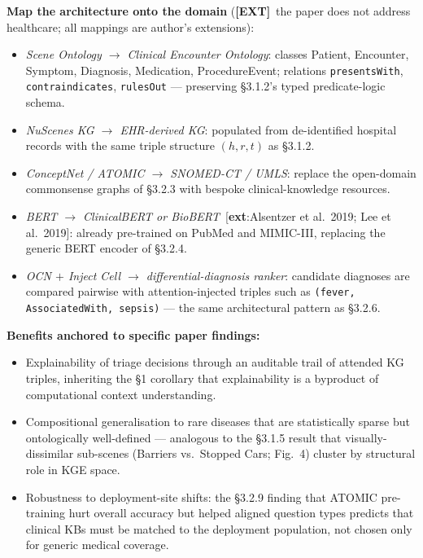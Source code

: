 \documentclass[11pt, a4paper]{article}
\newcommand{\extref}[1]{\textcolor{srcBd}{\small[\textbf{ext}:#1]}}
\newcommand{\extflag}{\textcolor{trapBd}{\textbf{[EXT]}}\,}
\begin{document}
\textbf{Map the architecture onto the domain} (\extflag{} the paper does not address healthcare; all mappings are author's extensions):
\begin{itemize}
  \item \emph{Scene Ontology \(\rightarrow\) Clinical Encounter Ontology}: classes Patient, Encounter, Symptom, Diagnosis, Medication, ProcedureEvent; relations \texttt{presentsWith}, \texttt{contraindicates}, \texttt{rulesOut} — preserving §3.1.2's typed predicate-logic schema.
  \item \emph{NuScenes KG \(\rightarrow\) EHR-derived KG}: populated from de-identified hospital records with the same triple structure \((h, r, t)\) as §3.1.2.
  \item \emph{ConceptNet / ATOMIC \(\rightarrow\) SNOMED-CT / UMLS}: replace the open-domain commonsense graphs of §3.2.3 with bespoke clinical-knowledge resources.
  \item \emph{BERT \(\rightarrow\) ClinicalBERT or BioBERT}~\extref{Alsentzer et al.\ 2019; Lee et al.\ 2019}: already pre-trained on PubMed and MIMIC-III, replacing the generic BERT encoder of §3.2.4.
  \item \emph{OCN $+$ Inject Cell \(\rightarrow\) differential-diagnosis ranker}: candidate diagnoses are compared pairwise with attention-injected triples such as \texttt{(fever, AssociatedWith, sepsis)} — the same architectural pattern as §3.2.6.
\end{itemize}

\textbf{Benefits anchored to specific paper findings:}
\begin{itemize}
  \item Explainability of triage decisions through an auditable trail of attended KG triples, inheriting the §1 corollary that explainability is a byproduct of computational context understanding.
  \item Compositional generalisation to rare diseases that are statistically sparse but ontologically well-defined — analogous to the §3.1.5 result that visually-dissimilar sub-scenes (Barriers vs.\ Stopped Cars; Fig.\ 4) cluster by structural role in KGE space.
  \item Robustness to deployment-site shifts: the §3.2.9 finding that ATOMIC pre-training hurt overall accuracy but helped aligned question types predicts that clinical KBs must be matched to the deployment population, not chosen only for generic medical coverage.
\end{itemize}
\end{document}
